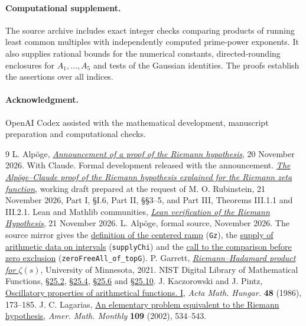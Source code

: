 \documentclass[11pt,a4paper]{article}
\begin{document}
\paragraph{Computational supplement.}
The source archive includes exact integer checks comparing products of running least common multiples with independently computed prime-power exponents. It also supplies rational bounds for the numerical constants, directed-rounding enclosures for $A_1,\ldots,A_5$ and tests of the Gaussian identities. The proofs establish the assertions over all indices.

\paragraph{Acknowledgment.}
OpenAI Codex assisted with the mathematical development, manuscript preparation and computational checks.

\begin{thebibliography}{9}\small
{} L. Alp\"oge, \href{https://alpo.ge/remark.pdf}{\emph{Announcement of a proof of the Riemann hypothesis}}, 20 November 2026. With Claude. Formal development released with the announcement.
 \href{https://www.math.uwaterloo.ca/~mrubinst/alpoge_claude_grh/zeta-paper.pdf}{\emph{The Alp\"oge--Claude proof of the Riemann hypothesis explained for the Riemann zeta function}}, working draft prepared at the request of M. O. Rubinstein, 21 November 2026, Part I, \S I.6, Part II, \S\S3--5, and Part III, Theorems III.1.1 and III.2.1.
 Lean and Mathlib communities, \href{https://leanprover-community.github.io/blog/posts/riemann-hypothesis/}{\emph{Lean verification of the Riemann Hypothesis}}, 21 November 2026.
 L. Alp\"oge, formal source, November 2026. The source mirror gives the \href{https://raw.githubusercontent.com/CocoSgt/riemann-hypothesis-lean/main/src/Formalism/StatementOC.lean}{definition of the centered ramp} (\texttt{Gz}), the \href{https://raw.githubusercontent.com/CocoSgt/riemann-hypothesis-lean/main/src/Development/AutomorphicArithmetic/CharacterBoxes/SupplyChi.lean}{supply of arithmetic data on intervals} (\texttt{supplyChi}) and the \href{https://raw.githubusercontent.com/CocoSgt/riemann-hypothesis-lean/main/src/Development/AutomorphicArithmetic/CharacterBoxes/ZeroFreeAllOfTopG.lean}{call to the comparison before zero exclusion} (\texttt{zeroFreeAll\_of\_topG}).
 P. Garrett, \href{https://www-users.cse.umn.edu/~garrett/m/number_theory/riemann_hadamard_product.pdf}{\emph{Riemann--Hadamard product for $\zeta(s)$}}, University of Minnesota, 2021.
 NIST Digital Library of Mathematical Functions, \href{https://dlmf.nist.gov/25.2}{\S25.2}, \href{https://dlmf.nist.gov/25.4}{\S25.4}, \href{https://dlmf.nist.gov/25.6}{\S25.6} and \href{https://dlmf.nist.gov/25.10}{\S25.10}.
 J. Kaczorowski and J. Pintz, \href{https://doi.org/10.1007/BF01949062}{Oscillatory properties of arithmetical functions. I}, \emph{Acta Math. Hungar.} \textbf{48} (1986), 173--185.
 J. C. Lagarias, \href{https://arxiv.org/abs/math/0008177}{An elementary problem equivalent to the Riemann hypothesis}, \emph{Amer. Math. Monthly} \textbf{109} (2002), 534--543.
\end{thebibliography}
\end{document}
